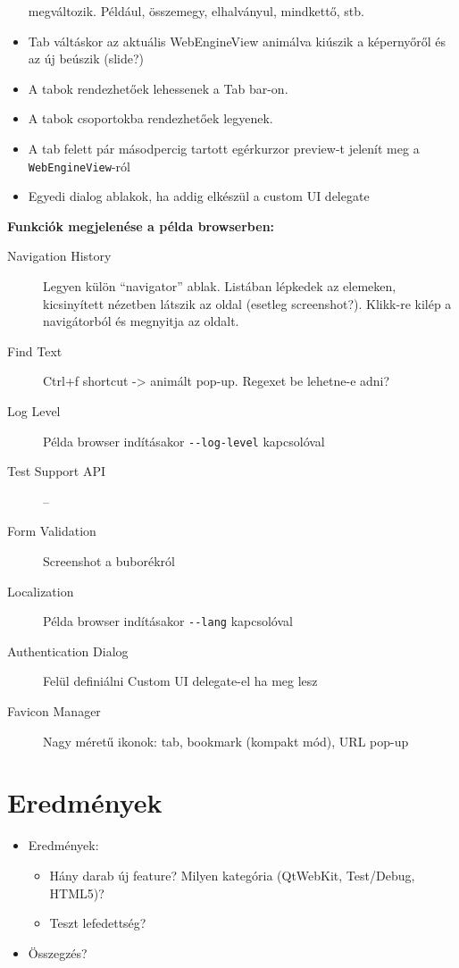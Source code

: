 \documentclass[12pt]{report}
\begin{document}
\begin{itemize}
        megváltozik. Például, összemegy, elhalványul, mindkettő, stb.
    \item Tab váltáskor az aktuális WebEngineView animálva kiúszik a képernyőről és az
        új beúszik (slide?)
    \item A tabok rendezhetőek lehessenek a Tab bar-on.
    \item A tabok csoportokba rendezhetőek legyenek.
    \item A tab felett pár másodpercig tartott egérkurzor preview-t jelenít meg a \\
        \texttt{WebEngineView}-ról
    \item Egyedi dialog ablakok, ha addig elkészül a custom UI delegate
\end{itemize}

\noindent
\textbf{Funkciók megjelenése a példa browserben:}
\begin{description}
    \item[Navigation History] Legyen külön ``navigator'' ablak. Listában lépkedek az
        elemeken, kicsinyített nézetben látszik az oldal (esetleg screenshot?). Klikk-re
        kilép a navigátorból és megnyitja az oldalt.
    \item[Find Text] Ctrl+f shortcut -> animált pop-up. Regexet be lehetne-e adni?
    \item[Log Level] Példa browser indításakor \texttt{-{}-log-level} kapcsolóval
    \item[Test Support API] --
    \item[Form Validation] Screenshot a buborékról
    \item[Localization] Példa browser indításakor \texttt{-{}-lang} kapcsolóval
    \item[Authentication Dialog] Felül definiálni Custom UI delegate-el ha meg lesz
    \item[Favicon Manager] Nagy méretű ikonok: tab, bookmark (kompakt mód), URL pop-up
\end{description}

\chapter*{Eredmények}
\begin{itemize}
    \item Eredmények:
        \begin{itemize}
            \item Hány darab új feature? Milyen kategória (QtWebKit, Test/Debug, HTML5)?
            \item Teszt lefedettség?
        \end{itemize}
    \item Összegzés?
\end{itemize}
\end{document}

